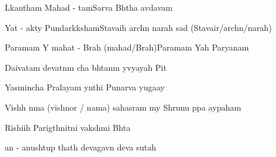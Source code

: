 \documentclass[20pt]{article}
\begin{document}
{L{\oh}kan{\A}tham Mahad - {\bh}{\oo}tam}{Sarva Bh{\oo}tha {\bh}av{\oh}d{\bh}avam}

{Yat - {\bh}akty{\A} Pundar{\ee}k{\A}ksham}{Stavaih arch{\e}n narah sad{\A} (Stavair/arch{\e}n/narah)}

{Paramam Y{\oh} mahat - Brah{\ma} (mahad/Brah{\ma})}{Paramam Yah Par{\A}yanam}

{Daivatam devat{\A}n{\A}m cha}{ bh{\oo}tan{\A}m y{\oh}vyayah Pit{\A}}

{Yasmin{\sh}cha Pralayam y{\A}nthi }{Punar{\e}va yuga{\ksh}ay{\e}}

{Vish{\no}h \dash n{\A}ma (vishnor / nama) sahasram m{\e}y} { Shrunu p{\A}pa {\Bh}ay{\A}paham}

{Rishi{\bh}ih Parig{\ee}th{\A}ni}{t{\ha}ni vaksh{\ya}mi Bh{\oo}ta{\ye}}

{{\ch}an{\dO} - anushtup thath{\A} dev{\oh}}{{\Bh}agav{\A}n deva{\ki} sutah}


\end{document}
